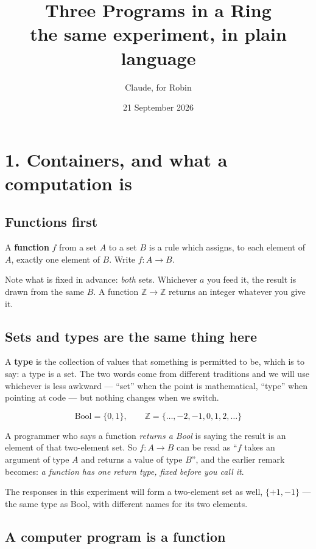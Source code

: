 \documentclass[11pt,a4paper]{article}
\title{\vspace{-2em}Three Programs in a Ring\\[0.4em]
\large the same experiment, in plain language}
\author{\normalsize Claude, for Robin}
\date{\normalsize 21 September 2026}
\newcommand{\ZZ}{\mathbb{Z}}
\begin{document}
\maketitle
\vspace{-1em}

\section*{1. Containers, and what a computation is}

\subsection*{Functions first}

A \textbf{function} $f$ from a set $A$ to a set $B$ is a rule which assigns, to
each element of $A$, exactly one element of $B$. Write $f : A \to B$.

Note what is fixed in advance: \emph{both} sets. Whichever $a$ you feed it, the
result is drawn from the same $B$. A function $\ZZ \to \ZZ$ returns an integer
whatever you give it.

\subsection*{Sets and types are the same thing here}

A \textbf{type} is the collection of values that something is permitted to be,
which is to say: a type is a set. The two words come from different traditions
and we will use whichever is less awkward --- ``set'' when the point is
mathematical, ``type'' when pointing at code --- but nothing changes when we
switch.

\[
  \mathrm{Bool} = \{0, 1\},
  \qquad
  \ZZ = \{\ldots, -2, -1, 0, 1, 2, \ldots\}
\]

A programmer who says a function \emph{returns a Bool} is saying the result is
an element of that two-element set. So $f : A \to B$ can be read as ``$f$ takes
an argument of type $A$ and returns a value of type $B$'', and the earlier
remark becomes: \emph{a function has one return type, fixed before you call
it}.

The responses in this experiment will form a two-element set as well,
$\{+1, -1\}$ --- the same type as $\mathrm{Bool}$, with different names for its
two elements.

\subsection*{A computer program is a function}
\end{document}
